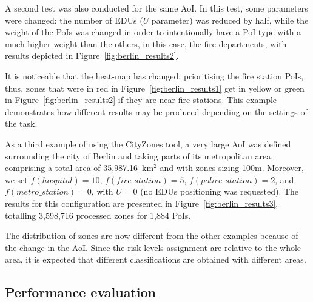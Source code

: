 \begin{refsection}
A second test was also conducted for the same AoI. In this test, some parameters were changed: the number of EDUs ($U$ parameter) was reduced by half, while the weight of the PoIs was changed in order to intentionally have a PoI type with a much higher weight than the others, in this case, the fire departments, with results depicted in Figure~\ref{fig:berlin_results2}.

It is noticeable that the heat-map has changed, prioritising the fire station PoIs, thus, zones that were in red in Figure~\ref{fig:berlin_results1} get in yellow or green in Figure~\ref{fig:berlin_results2} if they are near fire stations. This example demonstrates how different results may be produced depending on the settings of the task.

As a third example of using the CityZones tool, a very large AoI was defined surrounding the city of Berlin and taking parts of its metropolitan area, comprising a total area of 35,987.16~km$^2$ and with zones sizing 100m. Moreover, we set $f(hospital)=10$, $f(fire\_station)=5$, $f(police\_station)=2$, and $f(metro\_station)=0$, with $U=0$ (no EDUs positioning was requested). The results for this configuration are presented in Figure~\ref{fig:berlin_results3}, totalling 3,598,716 processed zones for 1,884 PoIs.

The distribution of zones are now different from the other examples because of the change in the AoI. Since the risk levels assignment are relative to the whole area, it is expected that different classifications are obtained with different areas.

\subsection{Performance evaluation}


\end{refsection}
